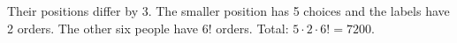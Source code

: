 Their positions differ by 3. The smaller position has 5 choices and the labels have 2 orders. The other six people have $6!$ orders. Total: $5\cdot2\cdot6!=\boxed{7200}$.
